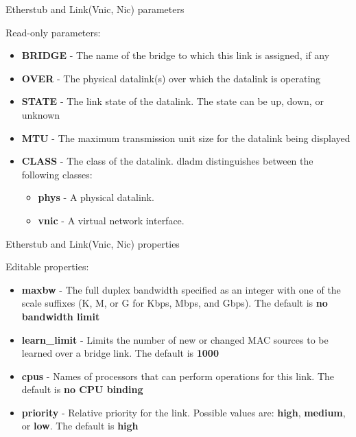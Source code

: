 \documentclass{beamer}
\begin{document}
		\begin{frame}{Etherstub and Link(Vnic, Nic) parameters }

			Read-only parameters:
			
			\begin{itemize}

				\item \textbf{BRIDGE} - The name of the bridge to which this link is assigned, if any
				\item \textbf{OVER} - The physical datalink(s) over which the datalink is operating
				\item \textbf{STATE} - The link state of the datalink. The state can be up, down, or unknown
				\item \textbf{MTU} - The maximum transmission unit size for the datalink being displayed
				\item \textbf{CLASS} - The class of the datalink. dladm distinguishes between the following classes:

					\begin{itemize}
						\item \textbf{phys} - A physical datalink. 
						\item \textbf{vnic} - A virtual network interface. 				
					\end{itemize}			
			\end{itemize}

		\end{frame}

		\begin{frame}{Etherstub and Link(Vnic, Nic) properties }

			Editable properties:
			
			\begin{itemize}

				\item \textbf{maxbw} - The full duplex bandwidth specified as an integer with one of the scale suffixes (K, M, or G for Kbps, Mbps, and Gbps). The default is \textbf{no bandwidth limit}
				\item \textbf{learn\_limit} - Limits the number of new or changed MAC sources to be learned over a bridge link. The default is \textbf{1000}
				\item \textbf{cpus} - Names of processors that can perform operations for this link. The default is \textbf{no CPU binding}
				\item \textbf{priority} - Relative priority for the link. Possible values are: \textbf{high}, \textbf{medium}, or \textbf{low}. The default is \textbf{high}
			
			\end{itemize}

		\end{frame}
\end{document}
